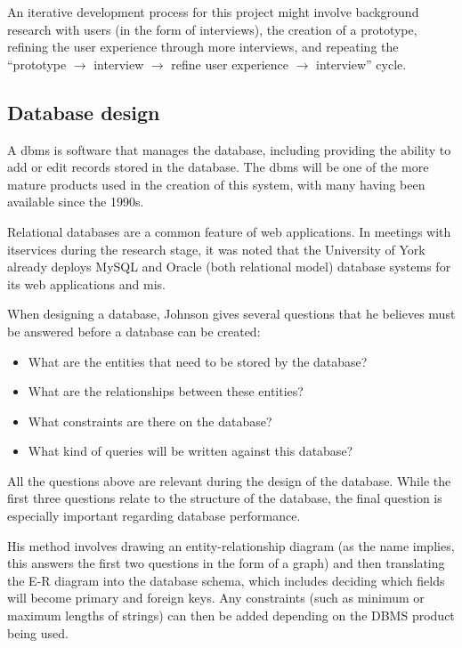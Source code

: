 \documentclass[draft]{scrartcl}
\begin{document}
An iterative development process for this project might involve background
research with users (in the form of interviews), the creation of a prototype,
refining the user experience through more interviews, and repeating the
``prototype $\rightarrow$ interview $\rightarrow$ refine user experience
$\rightarrow$ interview'' cycle.

\subsection{Database design}

A \gls{dbms} is software that manages the database, including providing the
ability to add or edit records stored in the database. The \gls{dbms} will be
one of the more mature products used in the creation of this system, with many
having been available since the 1990s.

Relational databases are a common feature of web applications. In meetings
with \gls{itservices} during the research stage, it was noted that the University
of York already deploys MySQL and Oracle (both relational model) database
systems for its web applications and \gls{mis}.

When designing a database, Johnson \cite{DatabaseModelsLanguagesDesign} gives
several questions that he believes must be answered before a database can be
created:

\begin{itemize}
  \item What are the entities that need to be stored by the database?
  \item What are the relationships between these entities?
  \item What constraints are there on the database?
  \item What kind of queries will be written against this database?
\end{itemize}

All the questions above are relevant during the design of the database. While
the first three questions relate to the structure of the database, the final
question is especially important regarding database performance.

His method involves drawing an entity-relationship diagram (as the name
implies, this answers the first two questions in the form of a graph) and then
translating the E-R diagram into the database schema, which includes deciding
which fields will become primary and foreign keys. Any constraints (such as
minimum or maximum lengths of strings) can then be added depending on the DBMS
product being used.
\end{document}
